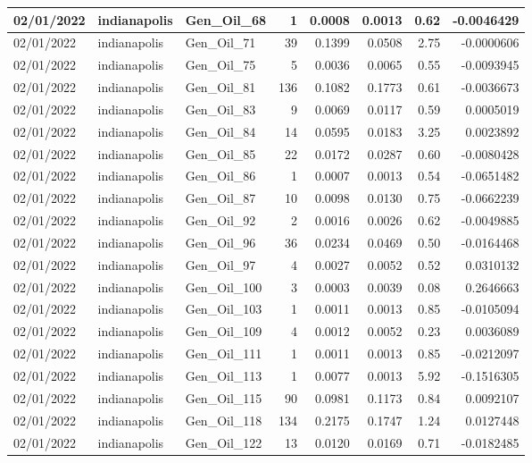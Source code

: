 \documentclass[
  letterpaper,
  DIV=11,
  numbers=noendperiod]{scrartcl}
\begin{document}
\begin{tabular}{l|l|l|r|r|r|r|r}
\hline
02/01/2022 & indianapolis & Gen\_Oil\_68 & 1 & 0.0008 & 0.0013 & 0.62 & -0.0046429\\
\hline
02/01/2022 & indianapolis & Gen\_Oil\_71 & 39 & 0.1399 & 0.0508 & 2.75 & -0.0000606\\
\hline
02/01/2022 & indianapolis & Gen\_Oil\_75 & 5 & 0.0036 & 0.0065 & 0.55 & -0.0093945\\
\hline
02/01/2022 & indianapolis & Gen\_Oil\_81 & 136 & 0.1082 & 0.1773 & 0.61 & -0.0036673\\
\hline
02/01/2022 & indianapolis & Gen\_Oil\_83 & 9 & 0.0069 & 0.0117 & 0.59 & 0.0005019\\
\hline
02/01/2022 & indianapolis & Gen\_Oil\_84 & 14 & 0.0595 & 0.0183 & 3.25 & 0.0023892\\
\hline
02/01/2022 & indianapolis & Gen\_Oil\_85 & 22 & 0.0172 & 0.0287 & 0.60 & -0.0080428\\
\hline
02/01/2022 & indianapolis & Gen\_Oil\_86 & 1 & 0.0007 & 0.0013 & 0.54 & -0.0651482\\
\hline
02/01/2022 & indianapolis & Gen\_Oil\_87 & 10 & 0.0098 & 0.0130 & 0.75 & -0.0662239\\
\hline
02/01/2022 & indianapolis & Gen\_Oil\_92 & 2 & 0.0016 & 0.0026 & 0.62 & -0.0049885\\
\hline
02/01/2022 & indianapolis & Gen\_Oil\_96 & 36 & 0.0234 & 0.0469 & 0.50 & -0.0164468\\
\hline
02/01/2022 & indianapolis & Gen\_Oil\_97 & 4 & 0.0027 & 0.0052 & 0.52 & 0.0310132\\
\hline
02/01/2022 & indianapolis & Gen\_Oil\_100 & 3 & 0.0003 & 0.0039 & 0.08 & 0.2646663\\
\hline
02/01/2022 & indianapolis & Gen\_Oil\_103 & 1 & 0.0011 & 0.0013 & 0.85 & -0.0105094\\
\hline
02/01/2022 & indianapolis & Gen\_Oil\_109 & 4 & 0.0012 & 0.0052 & 0.23 & 0.0036089\\
\hline
02/01/2022 & indianapolis & Gen\_Oil\_111 & 1 & 0.0011 & 0.0013 & 0.85 & -0.0212097\\
\hline
02/01/2022 & indianapolis & Gen\_Oil\_113 & 1 & 0.0077 & 0.0013 & 5.92 & -0.1516305\\
\hline
02/01/2022 & indianapolis & Gen\_Oil\_115 & 90 & 0.0981 & 0.1173 & 0.84 & 0.0092107\\
\hline
02/01/2022 & indianapolis & Gen\_Oil\_118 & 134 & 0.2175 & 0.1747 & 1.24 & 0.0127448\\
\hline
02/01/2022 & indianapolis & Gen\_Oil\_122 & 13 & 0.0120 & 0.0169 & 0.71 & -0.0182485\\

\end{tabular}
\end{document}
